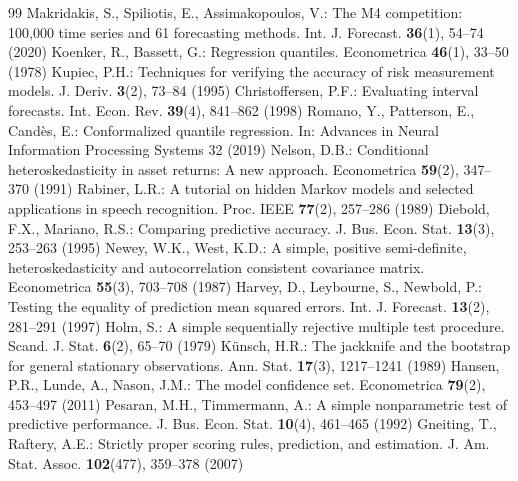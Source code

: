 \documentclass[runningheads]{llncs}
\begin{document}
\begin{thebibliography}{99}
 Makridakis, S., Spiliotis, E., Assimakopoulos, V.: The M4 competition: 100,000 time series and 61 forecasting methods. Int. J. Forecast. \textbf{36}(1), 54--74 (2020)
 Koenker, R., Bassett, G.: Regression quantiles. Econometrica \textbf{46}(1), 33--50 (1978)
 Kupiec, P.H.: Techniques for verifying the accuracy of risk measurement models. J. Deriv. \textbf{3}(2), 73--84 (1995)
 Christoffersen, P.F.: Evaluating interval forecasts. Int. Econ. Rev. \textbf{39}(4), 841--862 (1998)
 Romano, Y., Patterson, E., Cand\`{e}s, E.: Conformalized quantile regression. In: Advances in Neural Information Processing Systems 32 (2019)
 Nelson, D.B.: Conditional heteroskedasticity in asset returns: A new approach. Econometrica \textbf{59}(2), 347--370 (1991)
 Rabiner, L.R.: A tutorial on hidden Markov models and selected applications in speech recognition. Proc. IEEE \textbf{77}(2), 257--286 (1989)
 Diebold, F.X., Mariano, R.S.: Comparing predictive accuracy. J. Bus. Econ. Stat. \textbf{13}(3), 253--263 (1995)
 Newey, W.K., West, K.D.: A simple, positive semi-definite, heteroskedasticity and autocorrelation consistent covariance matrix. Econometrica \textbf{55}(3), 703--708 (1987)
 Harvey, D., Leybourne, S., Newbold, P.: Testing the equality of prediction mean squared errors. Int. J. Forecast. \textbf{13}(2), 281--291 (1997)
 Holm, S.: A simple sequentially rejective multiple test procedure. Scand. J. Stat. \textbf{6}(2), 65--70 (1979)
 K\"{u}nsch, H.R.: The jackknife and the bootstrap for general stationary observations. Ann. Stat. \textbf{17}(3), 1217--1241 (1989)
 Hansen, P.R., Lunde, A., Nason, J.M.: The model confidence set. Econometrica \textbf{79}(2), 453--497 (2011)
 Pesaran, M.H., Timmermann, A.: A simple nonparametric test of predictive performance. J. Bus. Econ. Stat. \textbf{10}(4), 461--465 (1992)
 Gneiting, T., Raftery, A.E.: Strictly proper scoring rules, prediction, and estimation. J. Am. Stat. Assoc. \textbf{102}(477), 359--378 (2007)
\end{thebibliography}
\end{document}

